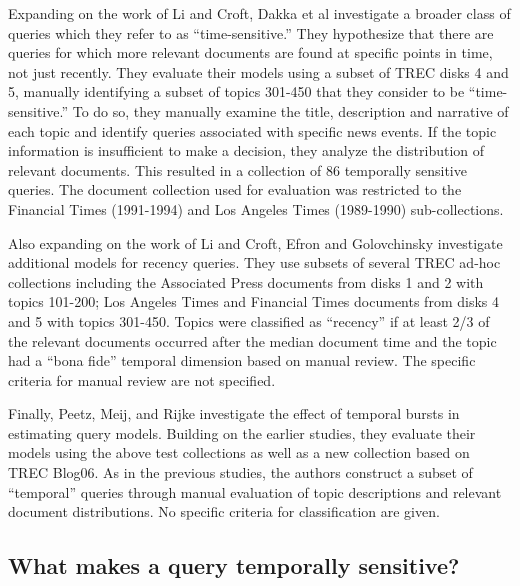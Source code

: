 \documentclass[runningheads,a4paper]{llncs}
\begin{document}
Expanding on the work of Li and Croft, Dakka et al \cite{Dakka2012} investigate a broader class of queries which they refer to as ``time-sensitive.'' They hypothesize that there are queries for which more relevant documents are found at specific points in time, not just recently. They evaluate their models using a subset of TREC disks 4 and 5, manually identifying a subset of topics 301-450 that they consider to be ``time-sensitive.'' To do so, they manually examine the title, description and narrative of each topic and identify queries associated with specific news events. If the topic information is insufficient to make a decision, they analyze the distribution of relevant documents. This resulted in a collection of 86 temporally sensitive queries. The document collection used for evaluation was restricted to the Financial Times (1991-1994) and Los Angeles Times (1989-1990) sub-collections.

Also expanding on the work of Li and Croft, Efron and Golovchinsky \cite{Efron2011} investigate additional models for recency queries. They use subsets of several TREC ad-hoc collections including the Associated Press documents from disks 1 and 2 with topics 101-200; Los Angeles Times and Financial Times documents from disks 4 and 5 with topics 301-450.  Topics were classified as ``recency'' if at least 2/3 of the relevant documents occurred after the median document time and the topic had a ``bona fide'' temporal dimension based on manual review. The specific criteria for manual review are not specified.  

Finally, Peetz, Meij, and Rijke \cite{Peetz2013} investigate the effect of temporal bursts in estimating query models. Building on the earlier studies, they evaluate their models using the above test collections as well as a new collection based on TREC Blog06. As in the previous studies, the authors construct a subset of ``temporal'' queries through manual evaluation of topic descriptions and relevant document distributions. No specific criteria for classification are given.

\subsection{What makes a query temporally sensitive?}
\end{document}
